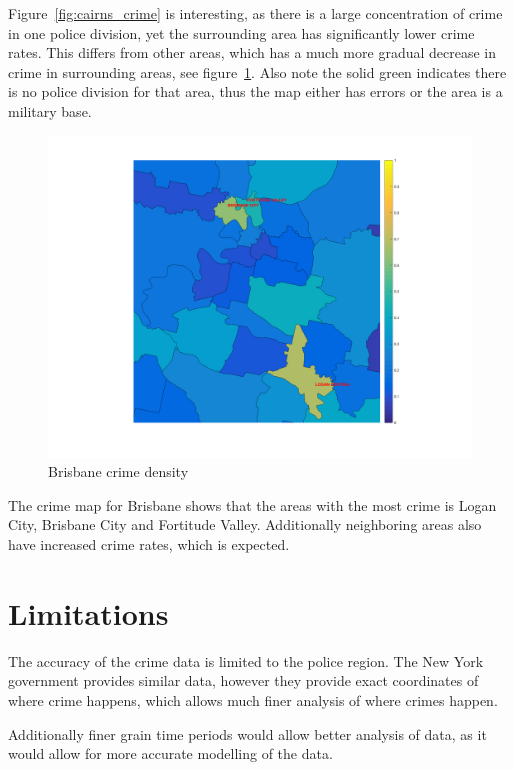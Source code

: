 \documentclass[]{article}
\begin{document}
Figure~\ref{fig:cairns_crime} is interesting, as there is a large concentration of crime in one police division,
yet the surrounding area has significantly lower crime rates.
This differs from other areas, which has a much more gradual decrease in crime in surrounding areas, see figure~\ref{fig:brisbane_crime}.
Also note the solid green indicates there is no police division for that area, thus the map either has errors
or the area is a military base.

\begin{figure}[H]
    \caption{Brisbane crime density}
    \centering
    \label{fig:brisbane_crime}
    \includegraphics[width=\linewidth]{../images/brisbane_crime}
\end{figure}

The crime map for Brisbane shows that the areas with the most crime is Logan City, Brisbane City and Fortitude Valley.
Additionally neighboring areas also have increased crime rates, which is expected.

\section{Limitations}

The accuracy of the crime data is limited to the police region.
The New York government provides similar data, however they provide exact coordinates
of where crime happens, which allows much finer analysis of where crimes happen.

Additionally finer grain time periods would allow better analysis of data, as it would allow for more
accurate modelling of the data.
\end{document}
